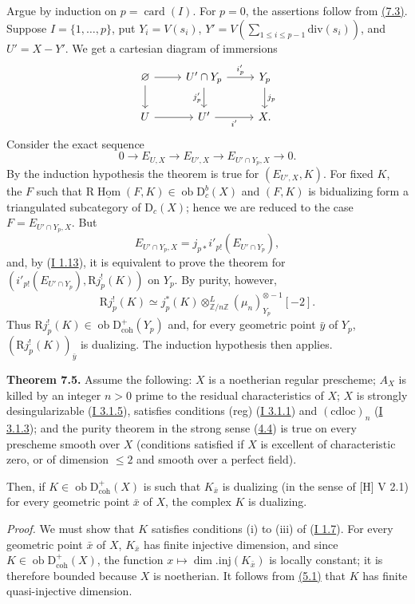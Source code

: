 \documentclass[11pt]{article}
\DeclareMathOperator{\Hom}{Hom}
\newcommand{\R}{\mathrm{R}}
\newcommand{\D}{\mathrm{D}}
\newcommand{\Z}{\mathbb{Z}}
\newcommand{\ob}{\operatorname{ob}}
\providecommand{\Hom}{\operatorname{Hom}}
\providecommand{\ob}{\operatorname{ob}}
\providecommand{\R}{\mathrm R}
\providecommand{\Z}{\mathbb Z}
\providecommand{\Hom}{\operatorname{Hom}}
\begin{document}
Argue by induction on $p=\operatorname{card}(I)$. For $p=0$, the assertions follow from \hyperref[sga5:I:lemma:7.3]{(7.3)}. Suppose $I=\{1,\ldots,p\}$, put $Y_i=V(s_i)$, $Y'=V(\sum_{1\leq i\leq p-1}\mathrm{div}(s_i))$, and $U'=X-Y'$. We get a cartesian diagram of immersions
\[
\begin{tikzcd}
\varnothing \arrow[r] \arrow[d] & U'\cap Y_p \arrow[r,"i'_p"] \arrow[d,"j'_p"'] & Y_p \arrow[d,"j_p"]\\
U \arrow[r] & U' \arrow[r,"i'"'] & X.
\end{tikzcd}
\]
Consider the exact sequence
\[
        0\longrightarrow E_{U,X}\longrightarrow E_{U',X}\longrightarrow E_{U'\cap Y_p,X}\longrightarrow0.
\]
By the induction hypothesis the theorem is true for $(E_{U',X},K)$. For fixed $K$, the $F$ such that $\R\underline{\Hom}(F,K)\in\ob\D_c^b(X)$ and $(F,K)$ is bidualizing form a triangulated subcategory of $\D_c(X)$; hence we are reduced to the case $F=E_{U'\cap Y_p,X}$. But
\[
        E_{U'\cap Y_p,X}=j_{p*}i'_{p!}(E_{U'\cap Y_p}),
\]
and, by (\hyperref[sga5:I:corollary:1.13]{I 1.13}), it is equivalent to prove the theorem for $(i'_{p!}(E_{U'\cap Y_p}),\R j_p^!(K))$ on $Y_p$. By purity, however,
\[
        \R j_p^!(K)\simeq j_p^*(K)\otimes^L_{\Z/n\Z}(\mu_n)_{Y_p}^{\otimes -1}[-2].
\]
Thus $\R j_p^!(K)\in\ob\D^{+}_{\mathrm{coh}}(Y_p)$ and, for every geometric point $\bar{y}$ of $Y_p$, $(\R j_p^!(K))_{\bar{y}}$ is dualizing. The induction hypothesis then applies.

\label{sga5:I:theorem:7.5}\textbf{Theorem 7.5.} Assume the following: $X$ is a noetherian regular prescheme; $A_X$ is killed by an integer $n>0$ prime to the residual characteristics of $X$; $X$ is strongly desingularizable (\hyperref[sga5:I:statement:3.1.5]{I 3.1.5}), satisfies conditions (reg) (\hyperref[sga5:I:statement:3.1.1]{I 3.1.1}) and $(\mathrm{cdloc})_n$ (\hyperref[sga5:I:statement:3.1.3]{I 3.1.3}); and the purity theorem in the strong sense (\hyperref[sga5:I:definition:4.4]{4.4}) is true on every prescheme smooth over $X$ (conditions satisfied if $X$ is excellent of characteristic zero, or of dimension $\leq2$ and smooth over a perfect field).

Then, if $K\in\ob\D^{+}_{\mathrm{coh}}(X)$ is such that $K_{\bar{x}}$ is dualizing (in the sense of [H] V 2.1) for every geometric point $\bar{x}$ of $X$, the complex $K$ is dualizing.

\emph{Proof.} We must show that $K$ satisfies conditions (i) to (iii) of (\hyperref[sga5:I:definition:1.7]{I 1.7}). For every geometric point $\bar{x}$ of $X$, $K_{\bar{x}}$ has finite injective dimension, and since $K\in\ob\D^{+}_{\mathrm{coh}}(X)$, the function $x\mapsto\dim.\mathrm{inj}(K_{\bar{x}})$ is locally constant; it is therefore bounded because $X$ is noetherian. It follows from \hyperref[sga5:I:proposition:5.1]{(5.1)} that $K$ has finite quasi-injective dimension.
\end{document}
